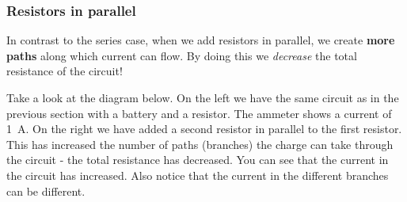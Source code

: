 \subsubsection*{Resistors in parallel}
In contrast to the series case, when we add resistors in parallel, we create \textbf{more paths} along which current can flow. By doing this we \textit{decrease} the total resistance of the circuit! 

Take a look at the diagram below. On the left we have the same circuit as in the previous section with a battery and a resistor. The ammeter shows a current of 1~A. On the right we have added a second resistor in parallel to the first resistor. This has increased the number of paths (branches) the charge can take through the circuit - the total resistance has decreased. You can see that the current in the circuit has increased. Also notice that the current in the different branches can be different.

